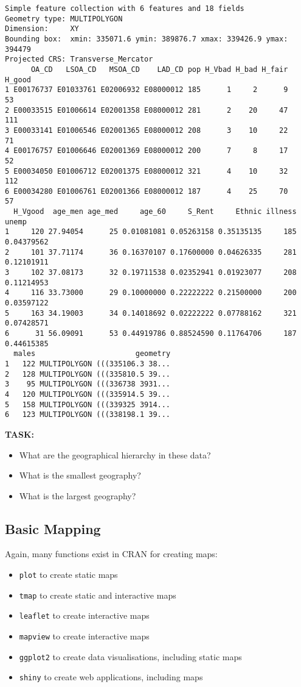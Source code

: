 \documentclass[
  letterpaper,
  krantz2]{style/krantz}
\providecommand{\tightlist}{%
  \setlength{\itemsep}{0pt}\setlength{\parskip}{0pt}}\usepackage{longtable,booktabs,array}
\begin{document}
\begin{verbatim}
Simple feature collection with 6 features and 18 fields
Geometry type: MULTIPOLYGON
Dimension:     XY
Bounding box:  xmin: 335071.6 ymin: 389876.7 xmax: 339426.9 ymax: 394479
Projected CRS: Transverse_Mercator
      OA_CD   LSOA_CD   MSOA_CD    LAD_CD pop H_Vbad H_bad H_fair H_good
1 E00176737 E01033761 E02006932 E08000012 185      1     2      9     53
2 E00033515 E01006614 E02001358 E08000012 281      2    20     47    111
3 E00033141 E01006546 E02001365 E08000012 208      3    10     22     71
4 E00176757 E01006646 E02001369 E08000012 200      7     8     17     52
5 E00034050 E01006712 E02001375 E08000012 321      4    10     32    112
6 E00034280 E01006761 E02001366 E08000012 187      4    25     70     57
  H_Vgood  age_men age_med     age_60     S_Rent     Ethnic illness      unemp
1     120 27.94054      25 0.01081081 0.05263158 0.35135135     185 0.04379562
2     101 37.71174      36 0.16370107 0.17600000 0.04626335     281 0.12101911
3     102 37.08173      32 0.19711538 0.02352941 0.01923077     208 0.11214953
4     116 33.73000      29 0.10000000 0.22222222 0.21500000     200 0.03597122
5     163 34.19003      34 0.14018692 0.02222222 0.07788162     321 0.07428571
6      31 56.09091      53 0.44919786 0.88524590 0.11764706     187 0.44615385
  males                       geometry
1   122 MULTIPOLYGON (((335106.3 38...
2   128 MULTIPOLYGON (((335810.5 39...
3    95 MULTIPOLYGON (((336738 3931...
4   120 MULTIPOLYGON (((335914.5 39...
5   158 MULTIPOLYGON (((339325 3914...
6   123 MULTIPOLYGON (((338198.1 39...
\end{verbatim}

\textbf{TASK:}

\begin{itemize}
\tightlist
\item
  What are the geographical hierarchy in these data?
\item
  What is the smallest geography?
\item
  What is the largest geography?
\end{itemize}

\hypertarget{basic-mapping}{%
\subsection{Basic Mapping}\label{basic-mapping}}

Again, many functions exist in CRAN for creating maps:

\begin{itemize}
\tightlist
\item
  \texttt{plot} to create static maps
\item
  \texttt{tmap} to create static and interactive maps
\item
  \texttt{leaflet} to create interactive maps
\item
  \texttt{mapview} to create interactive maps
\item
  \texttt{ggplot2} to create data visualisations, including static maps
\item
  \texttt{shiny} to create web applications, including maps
\end{itemize}
\end{document}
